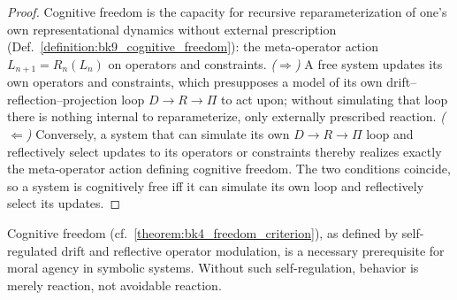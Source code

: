 \begin{proof}
\label{proof:bk9_selfreferential_capacity}
\leavevmode
Cognitive freedom is the capacity for recursive reparameterization of one's own representational dynamics without external prescription (Def.~\ref{definition:bk9_cognitive_freedom}): the meta-operator action $L_{n+1}=R_n(L_n)$ on operators and constraints. \emph{($\Rightarrow$)} A free system updates its own operators and constraints, which presupposes a model of its own drift--reflection--projection loop $D\to R\to\Pi$ to act upon; without simulating that loop there is nothing internal to reparameterize, only externally prescribed reaction. \emph{($\Leftarrow$)} Conversely, a system that can simulate its own $D\to R\to\Pi$ loop and reflectively select updates to its operators or constraints thereby realizes exactly the meta-operator action defining cognitive freedom. The two conditions coincide, so a system is cognitively free iff it can simulate its own loop and reflectively select its updates.
\end{proof}
\begin{corollary}
\label{corollary:bk9_emergence_of_moral_agency}
Cognitive freedom (cf.~\ref{theorem:bk4_freedom_criterion}), as defined by self-regulated drift and reflective operator modulation, is a necessary prerequisite for moral agency in symbolic systems. Without such self-regulation, behavior is merely reaction, not avoidable reaction.
\end{corollary}
